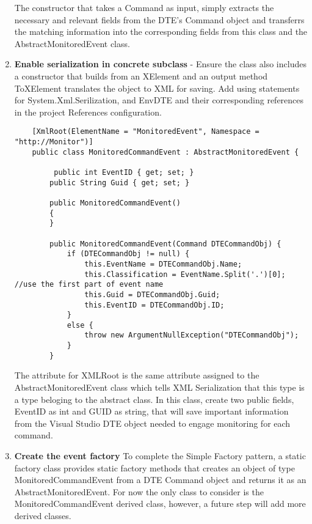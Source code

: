 \begin{enumerate}
 The constructor that takes a Command as input, simply extracts the necessary and relevant fields from the DTE's Command object and transferrs the matching information into the corresponding fields from this class and the AbstractMonitoredEvent class.  

\item {\bf Enable serialization in concrete subclass} -
Ensure the class also includes a constructor that builds from an XElement and an output method ToXElement translates the object to XML for saving. Add using statements for System.Xml.Serilization, and EnvDTE and their corresponding references in the project References configuration. 

\begin{lstlisting}
    [XmlRoot(ElementName = "MonitoredEvent", Namespace = "http://Monitor")]
    public class MonitoredCommandEvent : AbstractMonitoredEvent {

         public int EventID { get; set; }
        public String Guid { get; set; }

        public MonitoredCommandEvent()
        {
        }

        public MonitoredCommandEvent(Command DTECommandObj) {
            if (DTECommandObj != null) {
                this.EventName = DTECommandObj.Name;
                this.Classification = EventName.Split('.')[0];  //use the first part of event name
                this.Guid = DTECommandObj.Guid;
                this.EventID = DTECommandObj.ID;
            }
            else {
                throw new ArgumentNullException("DTECommandObj");
            }
        }
\end{lstlisting}

 The attribute for XMLRoot is the same attribute assigned to the AbstractMonitoredEvent class which tells XML Serialization that this type is a type beloging to the abstract class.  In this class, create two public fields, EventID as int and GUID as string, that will save important information from the Visual Studio DTE object needed to engage monitoring for each command.  

\item {\bf Create the event factory}
To complete the Simple Factory pattern, a static factory class provides static factory methods that creates an object of type  MonitoredCommandEvent from a DTE Command object and returns it as an AbstractMonitoredEvent.  For now the only class to consider is the MonitoredCommandEvent derived class, however, a future step will add more derived classes.  
\end{enumerate}

